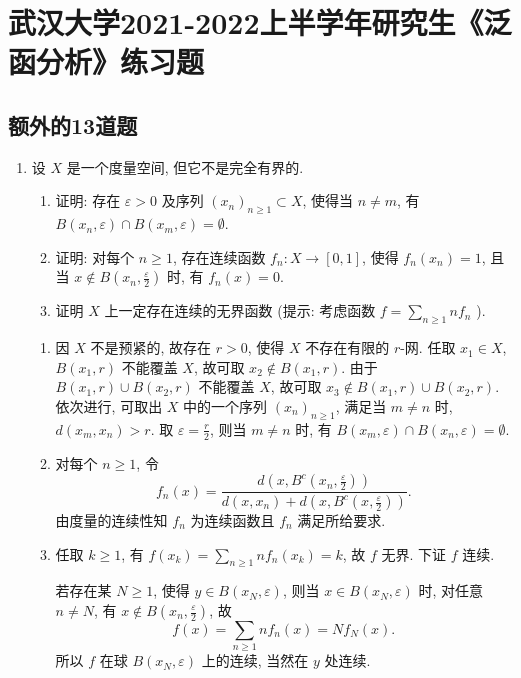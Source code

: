 \section{武汉大学2021-2022上半学年研究生《泛函分析》练习题}

\subsection{额外的13道题}
\begin{enumerate}
  \item 设 $X$ 是一个度量空间, 但它不是完全有界的.
    \begin{enumerate}
      \item 证明: 存在 $\varepsilon>0$ 及序列 $\left(x_{n}\right)_{n \geq 1} \subset X$, 使得当 $n \neq  m$, 有 $B\left(x_{n}, \varepsilon\right) \cap B\left(x_{m}, \varepsilon\right)=\emptyset$.
      \item 证明: 对每个 $n \geq 1$, 存在连续函数 $f_{n}: X \rightarrow[0,1]$, 使得 $f_{n}\left(x_{n}\right)=1$, 且当 $x \notin B\left(x_{n}, \frac{\varepsilon}{2}\right)$ 时, 有 $f_{n}(x)=0$.
      \item 证明 $X$ 上一定存在连续的无界函数 (提示: 考虑函数 $f=\sum_{n \geq 1} n f_{n}$ ).
    \end{enumerate}
    \begin{answer}
      \begin{enumerate}
        \item 因 $X$ 不是预紧的, 故存在 $r>0$, 使得 $X$ 不存在有限的 $r$-网.
        任取 $x_1\in X$, $B(x_1,r)$ 不能覆盖 $X$, 故可取 $x_2\notin B(x_1,r)$.
        由于 $B(x_1,r)\cup B(x_2,r)$ 不能覆盖 $X$, 故可取 $x_3\notin B(x_1,r)\cup B(x_2,r)$.
        依次进行, 可取出 $X$ 中的一个序列 $(x_n)_{n\geq 1}$, 满足当 $m\neq n$ 时, $d(x_m,x_n)>r$.
        取 $\varepsilon=\frac{r}{2}$, 则当 $m\neq n$ 时, 有 $B(x_m,\varepsilon)\cap B(x_n,\varepsilon)=\emptyset$.
    
        \item 对每个 $n\geq 1$, 令
        \[f_n(x)=\frac{d(x,B^c(x_n,\frac{\varepsilon}{2}))}{d(x,x_n)+d(x,B^c(x,\frac{\varepsilon}{2}))}.\]
        由度量的连续性知 $f_n$ 为连续函数且 $f_n$ 满足所给要求.
    
        \item 任取 $k\geq 1$, 有 $f(x_k)=\sum_{n\geq 1}nf_n(x_k)=k$, 故 $f$ 无界.
        下证 $f$ 连续. 
        
        若存在某 $N\geq 1$, 使得 $y\in B(x_N,\varepsilon)$, 则当 $x\in B(x_N,\varepsilon)$ 时,
        对任意 $n\neq N$, 有 $x\notin B(x_n,\frac{\varepsilon}{2})$, 故
        \[f(x)=\sum_{n\geq 1}nf_n(x)=Nf_N(x).\]
        所以 $f$ 在球 $B(x_N,\varepsilon)$ 上的连续, 当然在 $y$ 处连续.
    

\end{enumerate}
\end{answer}
\end{enumerate}
